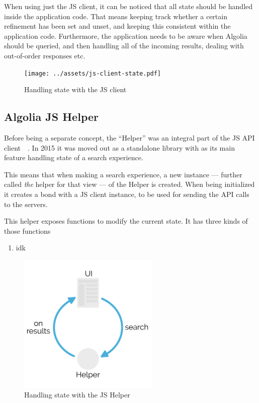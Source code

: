 When using just the JS client, it can be noticed that all state should be handled inside the application code. That means keeping track whether a certain refinement has been set and unset, and keeping this consistent within the application code. Furthermore, the application needs to be aware when Algolia should be queried, and then handling all of the incoming results, dealing with out-of-order responses etc.

\begin{figure}[H]
\label{figure:js-client-state}
  \centering
  \texttt{[image: ../assets/js-client-state.pdf]}
  \caption{Handling state with the JS client}
\end{figure}


\subsection{Algolia JS Helper} %
\label{sub:algolia_js_helper}

Before being a separate concept, the ``Helper'' was an integral part of the JS API client~\cite{algolia-blog-js-client}~. In 2015 it was moved out as a standalone library with as its main feature handling state of a search experience.

This means that when making a search experience, a new instance --- further called \emph{the} helper for that view --- of the Helper is created. When being initialized it creates a bond with a JS client instance, to be used for sending the API calls to the servers.

This helper exposes functions to modify the current state. It has three kinds of those functions

\begin{enumerate}
  \item idk %
\end{enumerate}

\begin{figure}[H]
\label{figure:js-helper-state}
  \centering
  \includegraphics[width=0.6\textwidth]{../assets/helper-cycle.pdf}
  \caption{Handling state with the JS Helper\cite{js-helper-concepts}}
\end{figure}

